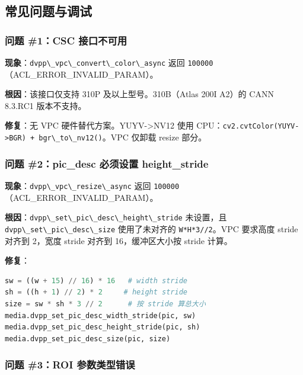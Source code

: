\subsection{常见问题与调试}\label{src-book-chapter6-h104}

\subsubsection{问题 \#1：CSC 接口不可用}\label{src-book-chapter6-h105}

\textbf{现象}：\passthrough{\lstinline!dvpp\_vpc\_convert\_color\_async!}
返回 \passthrough{\lstinline!100000!}（ACL\_ERROR\_INVALID\_PARAM）。

\textbf{根因}：该接口仅支持 310P 及以上型号。310B（Atlas 200I A2）的
CANN 8.3.RC1 版本不支持。

\textbf{修复}：无 VPC 硬件替代方案。YUYV-\textgreater NV12 使用
CPU：\passthrough{\lstinline!cv2.cvtColor(YUYV->BGR) + bgr\_to\_nv12()!}。VPC
仅卸载 resize 部分。

\subsubsection{问题 \#2：pic\_desc 必须设置
height\_stride}\label{src-book-chapter6-h106}

\textbf{现象}：\passthrough{\lstinline!dvpp\_vpc\_resize\_async!} 返回
\passthrough{\lstinline!100000!}（ACL\_ERROR\_INVALID\_PARAM）。

\textbf{根因}：\passthrough{\lstinline!dvpp\_set\_pic\_desc\_height\_stride!}
未设置，且 \passthrough{\lstinline!dvpp\_set\_pic\_desc\_size!}
使用了未对齐的 \passthrough{\lstinline!W*H*3//2!}。VPC 要求高度 stride
对齐到 2，宽度 stride 对齐到 16，缓冲区大小按 stride 计算。

\textbf{修复}：

\begin{lstlisting}[language=Python]
sw = ((w + 15) // 16) * 16   # width stride
sh = ((h + 1) // 2) * 2     # height stride
size = sw * sh * 3 // 2      # 按 stride 算总大小
media.dvpp_set_pic_desc_width_stride(pic, sw)
media.dvpp_set_pic_desc_height_stride(pic, sh)
media.dvpp_set_pic_desc_size(pic, size)
\end{lstlisting}

\subsubsection{问题 \#3：ROI 参数类型错误}\label{src-book-chapter6-h107}

